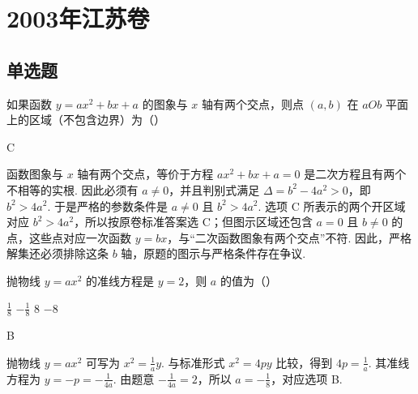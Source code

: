 \chapter{2003年江苏卷}
\section{单选题}
\begin{problem}
如果函数 \( y = ax^{2} + bx + a \) 的图象与 \( x \) 轴有两个交点，则点 \( (a, b) \) 在 \(aOb\) 平面上的区域（不包含边界）为（\quad）

    {}
    {}
    {}
\end{problem}

\begin{answer}
C
\end{answer}

\begin{solution}
函数图象与 \(x\) 轴有两个交点，等价于方程 \(ax^{2}+bx+a=0\) 是二次方程且有两个不相等的实根. 因此必须有 \(a\ne0\)，并且判别式满足 \(\Delta=b^{2}-4a^{2}>0\)，即 \(b^{2}>4a^{2}\). 于是严格的参数条件是 \(a\ne0\) 且 \(b^{2}>4a^{2}\). 选项 C 所表示的两个开区域对应 \(b^{2}>4a^{2}\)，所以按原卷标准答案选 C；但图示区域还包含 \(a=0\) 且 \(b\ne0\) 的点，这些点对应一次函数 \(y=bx\)，与“二次函数图象有两个交点”不符. 因此，严格解集还必须排除这条 \(b\) 轴，原题的图示与严格条件存在争议.
\end{solution}

\begin{problem}
抛物线 \( y = ax^{2} \) 的准线方程是 \( y = 2 \)，则 \( a \) 的值为（\quad）

\choices
    {\(\frac{1}{8}\)}
    {\(-\frac{1}{8}\)}
    {\(8\)}
    {\(-8\)}
\end{problem}

\begin{answer}
B
\end{answer}

\begin{solution}
抛物线 \(y=ax^{2}\) 可写为 \(x^{2}=\frac{1}{a}y\). 与标准形式 \(x^{2}=4py\) 比较，得到 \(4p=\frac{1}{a}\). 其准线方程为 \(y=-p=-\frac{1}{4a}\). 由题意 \(-\frac{1}{4a}=2\)，所以 \(a=-\frac{1}{8}\)，对应选项 B.
\end{solution}

